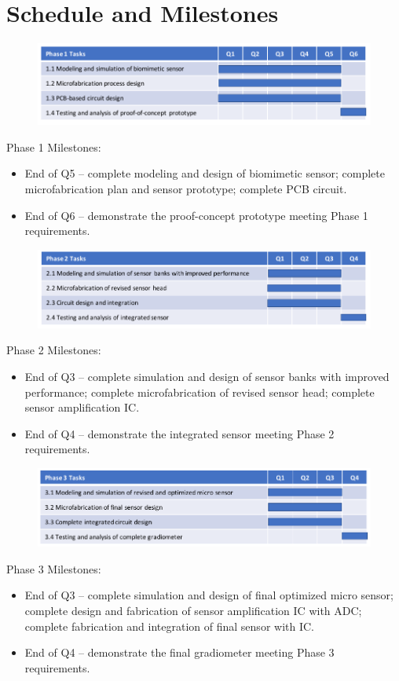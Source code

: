 \section{Schedule and Milestones}


\begin{figure}[H]
\centering
\includegraphics[width=\textwidth]{Gantt1}
\label{fig:gantt1}
\end{figure}
Phase 1 Milestones:
\begin{itemize}
\item End of Q5 – complete modeling and design of biomimetic sensor; complete microfabrication plan and sensor prototype;
complete PCB circuit.
\item End of Q6 – demonstrate the proof-concept prototype meeting Phase 1 requirements.
\end{itemize}


\begin{figure}[H]
\centering
\includegraphics[width=\textwidth]{Gantt2}
\label{fig:gantt2}
\end{figure}
Phase 2 Milestones:
\begin{itemize}
\item End of Q3 – complete simulation and design of sensor banks with improved performance; complete microfabrication
of revised sensor head; complete sensor amplification IC.
\item End of Q4 – demonstrate the integrated sensor meeting Phase 2 requirements.
\end{itemize}

\begin{figure}[H]
\centering
\includegraphics[width=\textwidth]{Gantt3}
\label{fig:gantt3}
\end{figure}
Phase 3 Milestones:
\begin{itemize}
\item End of Q3 – complete simulation and design of final optimized micro sensor; complete design and fabrication of
sensor amplification IC with ADC; complete fabrication and integration of final sensor with IC.
\item End of Q4 – demonstrate the final gradiometer meeting Phase 3 requirements.
\end{itemize}


